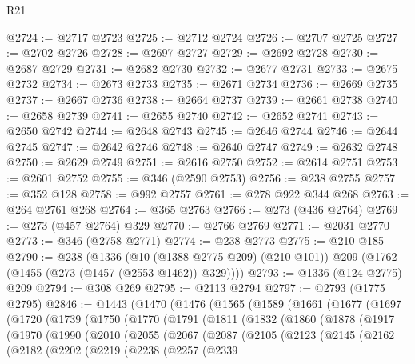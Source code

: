 \begin{lexlean}{R21}
\begin{coremodule}
{{{{{{{{{{{{{{{{{{{@2724 := @2717 @2723
@2725 := @2712 @2724
@2726 := @2707 @2725
@2727 := @2702 @2726
@2728 := @2697 @2727
@2729 := @2692 @2728
@2730 := @2687 @2729
@2731 := @2682 @2730
@2732 := @2677 @2731
@2733 := @2675 @2732
@2734 := @2673 @2733
@2735 := @2671 @2734
@2736 := @2669 @2735
@2737 := @2667 @2736
@2738 := @2664 @2737
@2739 := @2661 @2738
@2740 := @2658 @2739
@2741 := @2655 @2740
@2742 := @2652 @2741
@2743 := @2650 @2742
@2744 := @2648 @2743
@2745 := @2646 @2744
@2746 := @2644 @2745
@2747 := @2642 @2746
@2748 := @2640 @2747
@2749 := @2632 @2748
@2750 := @2629 @2749
@2751 := @2616 @2750
@2752 := @2614 @2751
@2753 := @2601 @2752
@2755 := @346 (@2590 @2753)
@2756 := @238 @2755
@2757 := @352 @128
@2758 := @992 @2757
@2761 := @278 @922 @344 @268
@2763 := @264 @2761 @268
@2764 := @365 @2763
@2766 := @273 (@436 @2764)
@2769 := @273 (@457 @2764) @329
@2770 := @2766 @2769
@2771 := @2031 @2770
@2773 := @346 (@2758 @2771)
@2774 := @238 @2773
@2775 := @210 @185
@2790 := @238
    (@1336
      (@10 (@1388 @2775 @209) (@210 @101))
      @209
      (@1762 (@1455 (@273 (@1457 (@2553 @1462)) @329))))
@2793 := @1336 (@124 @2775) @209
@2794 := @308 @269
@2795 := @2113 @2794
@2797 := @2793 (@1775 @2795)
@2846 := @1443
    (@1470
      (@1476
        (@1565
          (@1589
            (@1661
              (@1677
                (@1697
                  (@1720
                    (@1739
                      (@1750
                        (@1770
                          (@1791
                            (@1811
                              (@1832
                                (@1860
                                  (@1878
                                    (@1917
                                      (@1970
                                        (@1990
                                          (@2010
                                            (@2055
                                              (@2067
                                                (@2087
                                                  (@2105
                                                    (@2123
                                                      (@2145
                                                        (@2162
                                                          (@2182
                                                            (@2202
                                                              (@2219
                                                                (@2238
                                                                  (@2257
                                                                    (@2339
}}}}}}}}}}}}}}}}}}}
\end{coremodule}
\end{lexlean}

